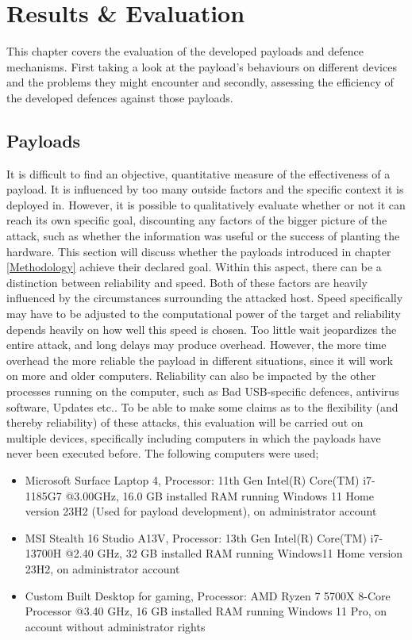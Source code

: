 \chapter{Results \& Evaluation} \label{Evaluation}

This chapter covers the evaluation of the developed payloads and defence mechanisms. First taking a look at the payload's behaviours on different devices and the problems they might encounter and secondly, assessing the efficiency of the developed defences against those payloads.


\section{Payloads}

It is difficult to find an objective, quantitative measure of the effectiveness of a payload. It is influenced by too many outside factors and the specific context it is deployed in. However, it is possible to qualitatively evaluate whether or not it can reach its own specific goal, discounting any factors of the bigger picture of the attack, such as whether the information was useful or the success of planting the hardware. This section will discuss whether the payloads introduced in chapter \ref{Methodology} achieve their declared goal. Within this aspect, there can be a distinction between reliability and speed. Both of these factors are heavily influenced by the circumstances surrounding the attacked host. Speed specifically may have to be adjusted to the computational power of the target and reliability depends heavily on how well this speed is chosen. Too little wait jeopardizes the entire attack, and long delays may produce overhead. However, the more time overhead the more reliable the payload in different situations, since it will work on more and older computers. Reliability can also be impacted by the other processes running on the computer, such as Bad USB-specific defences, antivirus software, Updates etc.. To be able to make some claims as to the flexibility (and thereby reliability) of these attacks, this evaluation will be carried out on multiple devices, specifically including computers in which the payloads have never been executed before. The following computers were used;

\begin{itemize}
    \item Microsoft Surface Laptop 4, Processor: 11th Gen Intel(R) Core(TM) i7-1185G7 @3.00GHz, 16.0 GB installed RAM running Windows 11 Home version 23H2 (Used for payload development), on administrator account
    \item MSI Stealth 16 Studio A13V, Processor: 13th Gen Intel(R) Core(TM) i7-13700H @2.40 GHz, 32 GB installed RAM running Windows11 Home version 23H2, on administrator account
    \item Custom Built Desktop for gaming, Processor: AMD Ryzen 7 5700X 8-Core Processor @3.40 GHz, 16 GB installed RAM running Windows 11 Pro, on account without administrator rights
\end{itemize}
    
